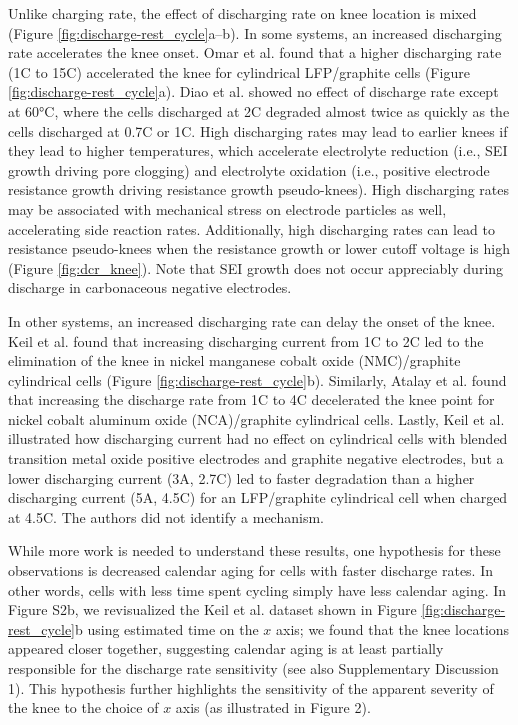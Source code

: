 \documentclass[journal=jpclcd,manuscript=article]{achemso}
\begin{document}
Unlike charging rate, the effect of discharging rate on knee location is mixed (Figure \ref{fig:discharge-rest_cycle}a--b).
In some systems, an increased discharging rate
accelerates the knee onset.
Omar et al.\cite{omar_lithium_2014} found that a higher discharging rate (1C to 15C) accelerated the knee for cylindrical LFP/graphite cells (Figure \ref{fig:discharge-rest_cycle}a).
Diao et al.\cite{diao_accelerated_2019} showed no effect of discharge rate except at 60°C, where the cells discharged at 2C degraded almost twice as quickly as the cells discharged at 0.7C or 1C.
High discharging rates may lead to earlier knees if they lead to higher temperatures, which accelerate electrolyte reduction (i.e., SEI growth driving pore clogging) and electrolyte oxidation (i.e., positive electrode resistance growth driving resistance growth pseudo-knees).
High discharging rates may be associated with mechanical stress on electrode particles as well, accelerating side reaction rates.\cite{christensen_mathematical_2006, allen_quantifying_2021, dubarry_cell_2014, sun_accelerated_2018}
Additionally, high discharging rates can lead to resistance pseudo-knees when the resistance growth or lower cutoff voltage is high (Figure \ref{fig:dcr_knee}).\cite{ma_editors_2019, mandli_analysis_2019}
Note that SEI growth does not occur appreciably during discharge in carbonaceous negative electrodes\cite{attia_electrochemical_2019, das_electrochemical_2019}.

In other systems, an increased discharging rate can delay the onset of the knee.
Keil et al.\cite{keil_linear_2019} found that increasing discharging current from 1C to 2C led to the elimination of the knee in nickel manganese cobalt oxide (NMC)/graphite cylindrical cells (Figure \ref{fig:discharge-rest_cycle}b).
Similarly, Atalay et al.\cite{atalay_theory_2020} found that increasing the discharge rate from 1C to 4C decelerated the knee point for nickel cobalt aluminum oxide (NCA)/graphite cylindrical cells.
Lastly, Keil et al.\cite{keil_charging_2016} illustrated how discharging current had no effect on cylindrical cells with blended transition metal oxide positive electrodes and graphite negative electrodes, but a lower discharging current (3A, 2.7C) led to faster degradation than a higher discharging current (5A, 4.5C) for an LFP/graphite cylindrical cell when charged at 4.5C.
The authors did not identify a mechanism. 

While more work is needed to understand these results, one hypothesis for these observations is decreased calendar aging for cells with faster discharge rates.
In other words, cells with less time spent cycling simply have less calendar aging. In Figure S2b, we revisualized the Keil et al.\cite{keil_linear_2019} dataset shown in Figure \ref{fig:discharge-rest_cycle}b using estimated time on the $x$ axis; we found that the knee locations appeared closer together, suggesting calendar aging is at least partially responsible for the discharge rate sensitivity (see also Supplementary Discussion 1). This hypothesis further highlights the sensitivity of the apparent severity of the knee to the choice of $x$ axis (as illustrated in Figure 2).
\end{document}

